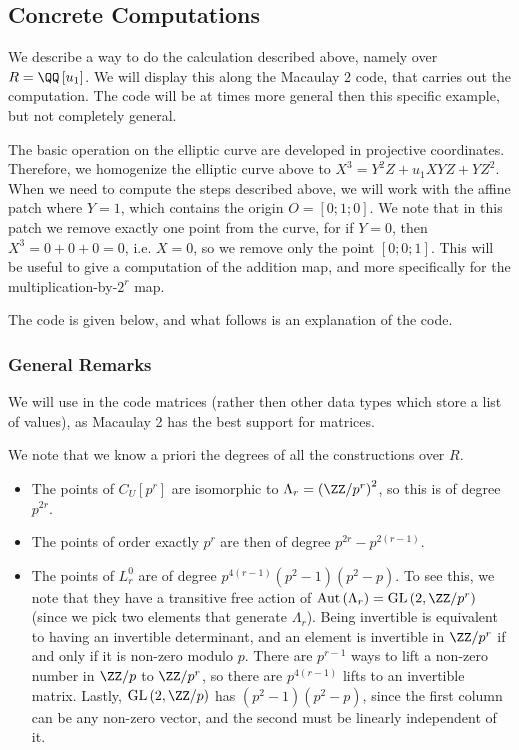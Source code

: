 \subsection{Concrete Computations}

We describe a way to do the calculation described above, namely over $R = \QQ\left[u_1\right]$.
We will display this along the Macaulay 2 code, that carries out the computation.
The code will be at times more general then this specific example, but not completely general.

The basic operation on the elliptic curve are developed in projective coordinates.
Therefore, we homogenize the elliptic curve above to $X^3 = Y^2 Z + u_1 X Y Z + Y Z^2$.
When we need to compute the steps described above, we will work with the affine patch where $Y = 1$, which contains the origin $O = \left[0;1;0\right]$.
We note that in this patch we remove exactly one point from the curve, for if $Y = 0$, then $X^3 = 0 + 0 + 0 = 0$, i.e. $X = 0$, so we remove only the point $\left[0;0;1\right]$.
This will be useful to give a computation of the addition map, and more specifically for the multiplication-by-$2^r$ map.

The code is given below, and what follows is an explanation of the code.

\subsubsection{General Remarks}\label{degree-considerations}

We will use in the code matrices (rather then other data types which store a list of values), as Macaulay 2 has the best support for matrices.

We note that we know a priori the degrees of all the constructions over $R$.
\begin{itemize}
	\item The points of $C_U\left[p^r\right]$ are isomorphic to $\Lambda_r = \left(\ZZ/p^r\right)^2$, so this is of degree $p^{2r}$.
	\item The points of order exactly $p^r$ are then of degree $p^{2r}-p^{2\left(r-1\right)}$.
	\item
		The points of $L_r^0$ are of degree $p^{4\left(r-1\right)}\left(p^2-1\right)\left(p^2-p\right)$.
		To see this, we note that they have a transitive free action of $\aut\left(\Lambda_r\right) = \GL\left(2, \ZZ/p^r\right)$ (since we pick two elements that generate $\Lambda_r$).
		Being invertible is equivalent to having an invertible determinant, and an element is invertible in $\ZZ/p^r$ if and only if it is non-zero modulo $p$.
		There are $p^{r-1}$ ways to lift a non-zero number in $\ZZ/p$ to $\ZZ/p^r$, so there are $p^{4\left(r-1\right)}$ lifts to an invertible matrix.
		Lastly, $\GL\left(2, \ZZ/p\right)$ has $\left(p^2-1\right)\left(p^2-p\right)$, since the first column can be any non-zero vector, and the second must be linearly independent of it.
\end{itemize}

